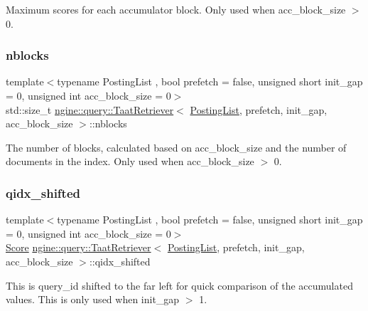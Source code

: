 Maximum scores for each accumulator block. Only used when acc\+\_\+block\+\_\+size $>$ 0. \mbox{\label{classngine_1_1query_1_1TaatRetriever_a6562a6b51152f7e28c65de1905a8c24d}} 
\subsubsection{\texorpdfstring{nblocks}{nblocks}}
{\footnotesize\ttfamily template$<$typename Posting\+List , bool prefetch = false, unsigned short init\+\_\+gap = 0, unsigned int acc\+\_\+block\+\_\+size = 0$>$ \\
std\+::size\+\_\+t \hyperlink{classngine_1_1query_1_1TaatRetriever}{ngine\+::query\+::\+Taat\+Retriever}$<$ \hyperlink{classngine_1_1PostingList}{Posting\+List}, prefetch, init\+\_\+gap, acc\+\_\+block\+\_\+size $>$\+::nblocks\hspace{0.3cm}{\ttfamily [protected]}}

The number of blocks, calculated based on acc\+\_\+block\+\_\+size and the number of documents in the index. Only used when acc\+\_\+block\+\_\+size $>$ 0. \mbox{\label{classngine_1_1query_1_1TaatRetriever_a6886c978fc175aa197c0ab2cecb94756}} 
\subsubsection{\texorpdfstring{qidx\+\_\+shifted}{qidx\_shifted}}
{\footnotesize\ttfamily template$<$typename Posting\+List , bool prefetch = false, unsigned short init\+\_\+gap = 0, unsigned int acc\+\_\+block\+\_\+size = 0$>$ \\
\hyperlink{structngine_1_1Score}{Score} \hyperlink{classngine_1_1query_1_1TaatRetriever}{ngine\+::query\+::\+Taat\+Retriever}$<$ \hyperlink{classngine_1_1PostingList}{Posting\+List}, prefetch, init\+\_\+gap, acc\+\_\+block\+\_\+size $>$\+::qidx\+\_\+shifted\hspace{0.3cm}{\ttfamily [protected]}}

This is query\+\_\+id shifted to the far left for quick comparison of the accumulated values. This is only used when init\+\_\+gap $>$ 1. \mbox{\label{classngine_1_1query_1_1TaatRetriever_a32220db1f5ce3701ef674071551c3179}} 
